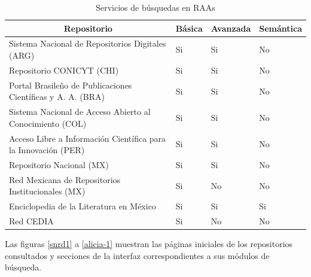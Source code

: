 \begin{table}[htbp]
\caption{Servicios de b\'usquedas en RAAs}
\begin{tabular}{| p{8.5cm}| p{1.5cm} | p{2cm} | p{2cm} |}
\hline
\multicolumn{1}{|c|}{\textbf{Repositorio}}                     & \textbf{B\'asica} & \textbf{Avanzada} & \textbf{Sem\'antica} \\ \hline
Sistema Nacional de  Repositorios Digitales (ARG)              & Si              & Si                & No                 \\ \hline
Repositorio CONICYT (CHI)                                      & Si              & Si                & No                 \\ \hline
Portal Brasileño de  Publicaciones Cient\'ificas y  A. A. (BRA)  & Si              & Si                & No                 \\ \hline
Sistema Nacional de  Acceso Abierto al Conocimiento (COL)      & Si              & Si                & No                 \\ \hline
Acceso Libre a Informaci\'on Cient\'ifica para la Innovaci\'on (PER) & Si              & Si                & No                 \\ \hline
Repositorio Nacional (MX)                                      & Si              & Si                & No                 \\ \hline
Red Mexicana de  Repositorios Institucionales (MX)             & Si              & No                & No                 \\ \hline
Enciclopedia de la Literatura en M\'exico                        & Si              & Si                & Si                 \\ \hline
Red CEDIA                                                      & Si              & No                & No                 \\ \hline
\end{tabular}
\label{busquedasRaas}
\end{table}

Las figuras \ref{snrd1} a  \ref{alicia-1} muestran las p\'aginas iniciales de los repositorios consultados y secciones de la interfaz correspondientes a sus m\'odulos de b\'usqueda.

